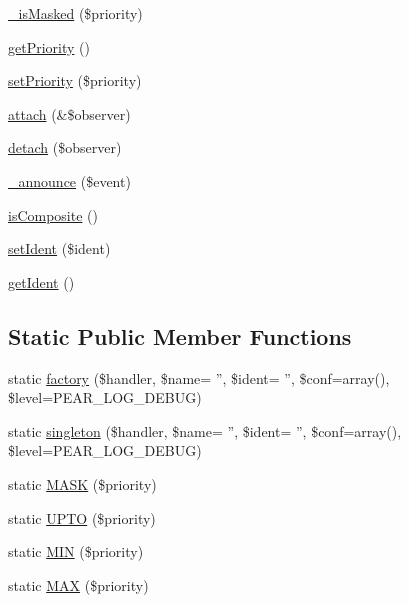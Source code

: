 \begin{DoxyCompactItemize}
\item 
\hyperlink{class_log_a51e80fca813e9028e8c0448f59d83f0c}{\_\-isMasked} (\$priority)
\item 
\hyperlink{class_log_a1e7a3c168dcd0901a0d2669c67575b55}{getPriority} ()
\item 
\hyperlink{class_log_a8f85e86a0294c2d785ad6c8561cf29fa}{setPriority} (\$priority)
\item 
\hyperlink{class_log_acb7594127105728a60bf0c4a3bf25f77}{attach} (\&\$observer)
\item 
\hyperlink{class_log_a298cab757ccb9aa7ae1bdc44c8132d92}{detach} (\$observer)
\item 
\hyperlink{class_log_a54b57e807f460cb860a56119dd415c16}{\_\-announce} (\$event)
\item 
\hyperlink{class_log_a2c140997a6e82a14ed58842d26bbb2c5}{isComposite} ()
\item 
\hyperlink{class_log_a9d8352d257344340d7a5b9c081d2a0d9}{setIdent} (\$ident)
\item 
\hyperlink{class_log_a6f57af0aea791a921f3df59d87588e82}{getIdent} ()
\end{DoxyCompactItemize}
\subsection*{Static Public Member Functions}
\begin{DoxyCompactItemize}
\item 
static \hyperlink{class_log_a6b64a01f123e8e670d5e9437db2b9e09}{factory} (\$handler, \$name= '', \$ident= '', \$conf=array(), \$level=PEAR\_\-LOG\_\-DEBUG)
\item 
static \hyperlink{class_log_a786d2551c6ba945c63ea4f1cffb5fd9e}{singleton} (\$handler, \$name= '', \$ident= '', \$conf=array(), \$level=PEAR\_\-LOG\_\-DEBUG)
\item 
static \hyperlink{class_log_a7dd897bd34e344d8e54284cac8c7c09c}{MASK} (\$priority)
\item 
static \hyperlink{class_log_ab8fe06c56819e3c5a34519e43fa7d668}{UPTO} (\$priority)
\item 
static \hyperlink{class_log_a7094dfd7cdabd103e201d99ec039c993}{MIN} (\$priority)
\item 
static \hyperlink{class_log_a1f96b8369a5f05a579c6f3a0697e4c69}{MAX} (\$priority)
\end{DoxyCompactItemize}
